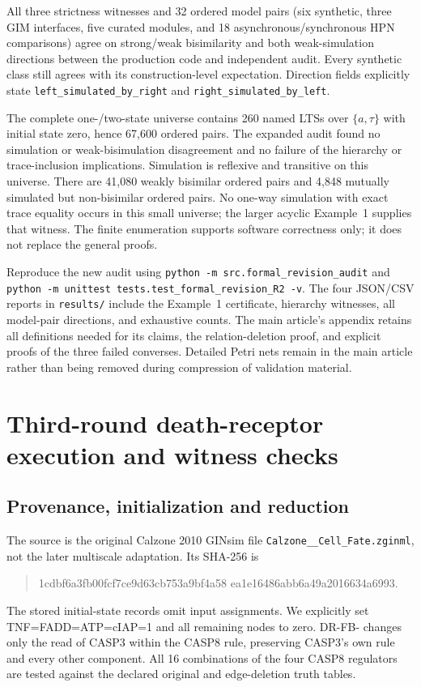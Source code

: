 \documentclass{ws-jbcb}
\numberwithin{equation}{section}
\begin{document}
All three strictness witnesses and 32 ordered model pairs (six synthetic,
three GIM interfaces, five curated modules, and 18 asynchronous/synchronous
HPN comparisons) agree on strong/weak bisimilarity and both weak-simulation
directions between the production code and independent audit. Every synthetic
class still agrees with its construction-level expectation. Direction fields
explicitly state \texttt{left\_simulated\_by\_right} and
\texttt{right\_simulated\_by\_left}.

The complete one-/two-state universe contains 260 named LTSs over
$\{a,\tau\}$ with initial state zero, hence 67,600 ordered pairs. The expanded
audit found no simulation or weak-bisimulation disagreement and no failure of
the hierarchy or trace-inclusion implications. Simulation is reflexive and
transitive on this universe. There are 41,080 weakly bisimilar ordered pairs
and 4,848 mutually simulated but non-bisimilar ordered pairs. No one-way
simulation with exact trace equality occurs in this small universe; the
larger acyclic Example~1 supplies that witness. The finite enumeration
supports software correctness only; it does not replace the general proofs.

Reproduce the new audit using
\texttt{python -m src.formal\_revision\_audit} and
\texttt{python -m unittest tests.test\_formal\_revision\_R2 -v}.
The four JSON/CSV reports in \texttt{results/} include the Example~1
certificate, hierarchy witnesses, all model-pair directions, and exhaustive
counts. The main article's appendix retains all definitions needed for its
claims, the relation-deletion proof, and explicit proofs of the three failed
converses. Detailed Petri nets remain in the main article rather than being
removed during compression of validation material.
\section{Third-round death-receptor execution and witness checks}

\subsection{Provenance, initialization and reduction}
The source is the original Calzone 2010 GINsim file
\texttt{Calzone\_\_Cell\_Fate.zginml}, not the later multiscale adaptation.
Its SHA-256 is
\begin{quote}\small\ttfamily
1cdbf6a3fb00fcf7ce9d63cb753a9bf4a58\allowbreak
ea1e16486abb6a49a2016634a6993.
\end{quote}
The stored initial-state records omit input assignments. We explicitly set
TNF=FADD=ATP=cIAP=1 and all remaining nodes to zero. DR-FB- changes only the
read of CASP3 within the CASP8 rule, preserving CASP3's own rule and every
other component. All 16 combinations of the four CASP8 regulators are tested
against the declared original and edge-deletion truth tables.
\end{document}
